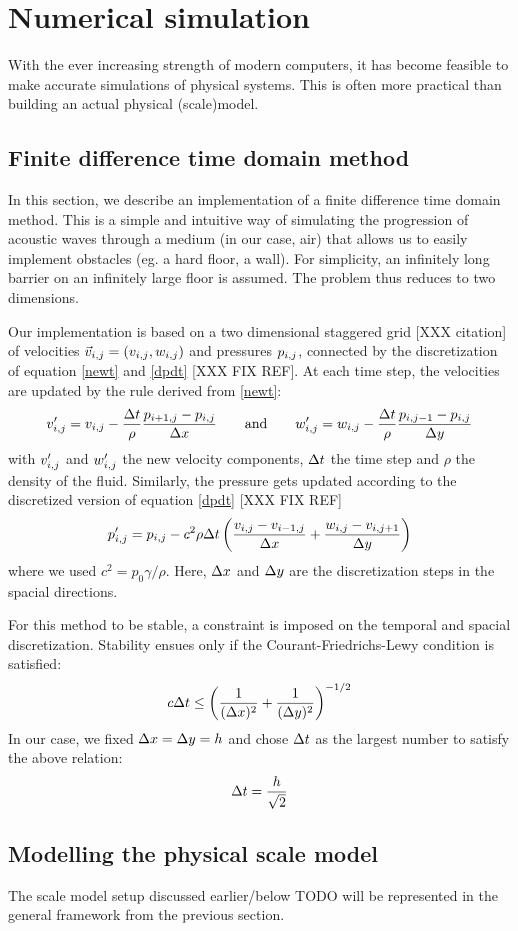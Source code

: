 \section{Numerical simulation}
With the ever increasing strength of modern computers, it has become feasible to make accurate simulations of physical systems. This is often more practical than building an actual physical (scale)model.


\subsection{Finite difference time domain method}
In this section, we describe an implementation of a finite difference time domain method. This is a simple and intuitive way of simulating the progression of acoustic waves through a medium (in our case, air) that allows us to easily implement obstacles (eg. a hard floor, a wall). For simplicity, an infinitely long barrier on an infinitely large floor is assumed. The problem thus reduces to two dimensions.

Our implementation is based on a two dimensional staggered grid [XXX citation] of velocities $\vec{v}_{i,j} = (v_{i,j}, w_{i,j})$ and pressures $p_{i,j}$, connected by the discretization of equation \ref{newt} and \ref{dpdt} [XXX FIX REF]. At each time step, the velocities are updated by the rule derived from \ref{newt}:
$$
v_{i,j}' = v_{i,j} - \frac{\Delta t}{\rho} \frac{p_{i+1,j} - p_{i,j}}{\Delta x}
\qquad \textrm{and} \qquad
w_{i,j}' = w_{i,j} - \frac{\Delta t}{\rho} \frac{p_{i,j-1} - p_{i,j}}{\Delta y}
$$
with $v_{i,j}'$ and $w_{i,j}'$ the new velocity components, $\Delta t$ the time step and $\rho$ the density of the fluid. Similarly, the pressure gets updated according to the discretized version of equation \ref{dpdt} [XXX FIX REF]
$$
p_{i,j}' = p_{i,j} - c^2 \rho \Delta t \left(\frac{v_{i,j} - v_{i-1,j}}{\Delta x} + \frac{w_{i,j} - v_{i,j+1}}{\Delta y}\right)
$$
where we used $c^2 = p_0 \gamma / \rho$. Here, $\Delta x$ and $\Delta y$ are the discretization steps in the spacial directions.

For this method to be stable, a constraint is imposed on the temporal and spacial discretization. Stability ensues only if the Courant-Friedrichs-Lewy condition is satisfied\cite{courant-friedrichs-lewy}\cite{numerical-stability-and-numerical-dispersion-of-a-compact-2D...}:
$$
c\Delta t \leq \left(\frac{1}{(\Delta x)^2} + \frac{1}{(\Delta y)^2}\right) ^ {-1/2}
$$
In our case, we fixed $\Delta x = \Delta y = h$ and chose $\Delta t$ as the largest number to satisfy the above relation:
$$
\Delta t = \frac{h}{\sqrt{2}}
$$


\subsection{Modelling the physical scale model}
The scale model setup discussed earlier/below TODO will be represented in the general framework from the previous section.

